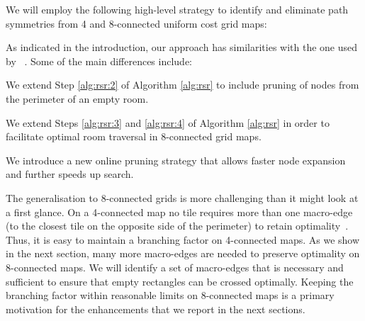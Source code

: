 We will employ the following high-level strategy to
identify and eliminate path symmetries from 4 and 8-connected uniform cost grid maps:


As indicated in the introduction, our approach has similarities with the one used by 
\citeauthor{harabor10}~.
Some of the main differences include:
\begin{enumerate}
\item{
We extend Step \ref{alg:rsr:2} of Algorithm \ref{alg:rsr} 
to include pruning of nodes from the perimeter of an empty room.
}
\item{
We extend Steps \ref{alg:rsr:3} and \ref{alg:rsr:4} of Algorithm
\ref{alg:rsr} in order to facilitate optimal room traversal in 8-connected grid
maps. 
\item{We introduce a new online pruning strategy that allows faster node
expansion and further speeds up search.}
}
\end{enumerate}
The generalisation to 8-connected grids is more challenging than it might look at a first glance.
On a 4-connected map no tile requires more than one macro-edge
(to the closest tile on the opposite side of the perimeter)
to retain optimality~\cite{harabor10}.
Thus, it is easy to maintain a branching factor on 4-connected maps.
As we show in the next section, many more macro-edges are needed to preserve optimality
on 8-connected maps. We will identify a set of macro-edges that is necessary and sufficient
to ensure that empty rectangles can be crossed optimally.
Keeping the branching factor within reasonable limits on 8-connected maps
is a primary motivation for the enhancements that we report in the next sections.


